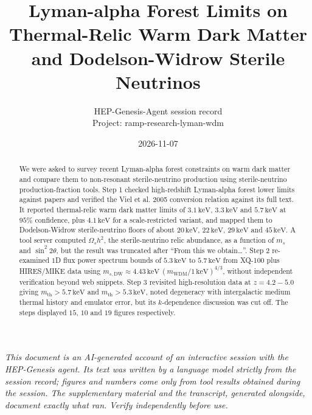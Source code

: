 \documentclass[11pt,a4paper]{article}
\title{Lyman-alpha Forest Limits on Thermal-Relic Warm Dark Matter and Dodelson-Widrow Sterile Neutrinos}
\author{HEP-Genesis-Agent session record \\ \small Project: ramp-research-lyman-wdm}
\date{2026-11-07}
\begin{document}
\maketitle
\noindent\textit{\small This document is an AI-generated account of an interactive session with the HEP-Genesis agent. Its text was written by a language model strictly from the session record; figures and numbers come only from tool results obtained during the session. The supplementary material and the transcript, generated alongside, document exactly what ran. Verify independently before use.}
\vspace{1em}

\begin{abstract}
We were asked to survey recent Lyman-alpha forest constraints on warm dark matter and compare them to non-resonant sterile-neutrino production using sterile-neutrino production-fraction tools. Step 1 checked high-redshift Lyman-alpha forest lower limits against papers and verified the Viel et al. 2005 conversion relation against its full text. It reported thermal-relic warm dark matter limits of $3.1\,\mathrm{keV}$, $3.3\,\mathrm{keV}$ and $5.7\,\mathrm{keV}$ at $95\%$ confidence, plus $4.1\,\mathrm{keV}$ for a scale-restricted variant, and mapped them to Dodelson-Widrow sterile-neutrino floors of about $20\,\mathrm{keV}$, $22\,\mathrm{keV}$, $29\,\mathrm{keV}$ and $45\,\mathrm{keV}$. A tool server computed $\Omega_s h^2$, the sterile-neutrino relic abundance, as a function of $m_s$ and $\sin^2 2\theta$, but the result was truncated after ``From this we obtain\ldots{}''. Step 2 re-examined $1$D flux power spectrum bounds of $5.3\,\mathrm{keV}$ to $5.7\,\mathrm{keV}$ from XQ-100 plus HIRES/MIKE data using $m_{s,\mathrm{DW}} \approx 4.43\,\mathrm{keV}\,(m_{\mathrm{WDM}}/1\,\mathrm{keV})^{4/3}$, without independent verification beyond web snippets. Step 3 revisited high-resolution data at $z = 4.2-5.0$ giving $m_{\mathrm{th}} > 5.7\,\mathrm{keV}$ and $m_{\mathrm{th}} > 5.3\,\mathrm{keV}$, noted degeneracy with intergalactic medium thermal history and emulator error, but its $k$-dependence discussion was cut off. The steps displayed $15$, $10$ and $19$ figures respectively.
\end{abstract}
\end{document}
